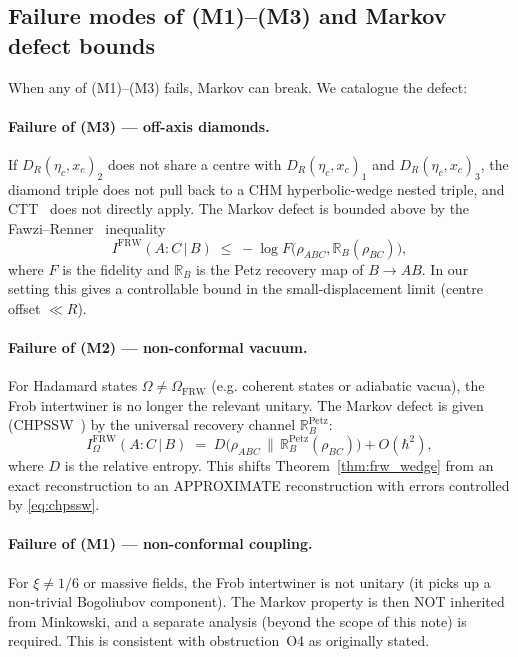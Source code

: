 \documentclass[11pt,a4paper]{article}
\theoremstyle{remark}
\newcommand{\FRW}{{\mathrm{FRW}}}
\newcommand{\R}{\mathbb{R}}
\newcommand{\DR}{D_R(\eta_c,x_c)}
\begin{document}
\subsection{Failure modes of (M1)--(M3) and Markov defect bounds}
\label{sec:markov_defect}

When any of (M1)--(M3) fails, Markov can break.  We catalogue the
defect:

\paragraph{Failure of (M3) --- off-axis diamonds.}
If $\DR_2$ does not share a centre with $\DR_1$ and $\DR_3$, the
diamond triple does not pull back to a CHM hyperbolic-wedge nested
triple, and CTT~\cite{CTT2017} does not directly apply.  The Markov
defect is bounded above by the Fawzi--Renner~\cite{FawziRenner2015}
inequality
\begin{equation}
  I^{\FRW}(A:C\,|\,B) \;\leq\; -\log F\bigl(\rho_{ABC},
   \R_B(\rho_{BC})\bigr),
\label{eq:fawzi_renner}
\end{equation}
where $F$ is the fidelity and $\R_B$ is the Petz recovery map of
$B \to AB$.  In our setting this gives a controllable bound in the
small-displacement limit (centre offset $\ll R$).

\paragraph{Failure of (M2) --- non-conformal vacuum.}
For Hadamard states $\Omega \neq \Omega_{\FRW}$ (e.g. coherent states or
adiabatic vacua), the Frob intertwiner is no longer the relevant
unitary.  The Markov defect is given (CHPSSW~\cite{CHPSSW2017}) by
the universal recovery channel $\R^{\mathrm{Petz}}_B$:
\begin{equation}
  I^{\FRW}_{\Omega}(A:C\,|\,B) \;=\;
  D\bigl(\rho_{ABC} \,\big\|\, \R^{\mathrm{Petz}}_B(\rho_{BC})\bigr) + O(\hbar^2),
\label{eq:chpssw}
\end{equation}
where $D$ is the relative entropy.  This shifts Theorem~\ref{thm:frw_wedge}
from an exact reconstruction to an APPROXIMATE reconstruction with
errors controlled by \eqref{eq:chpssw}.

\paragraph{Failure of (M1) --- non-conformal coupling.}
For $\xi \neq 1/6$ or massive fields, the Frob intertwiner is not
unitary (it picks up a non-trivial Bogoliubov component).  The Markov
property is then NOT inherited from Minkowski, and a separate analysis
(beyond the scope of this note) is required.  This is consistent with
obstruction~O4 as originally stated.
\end{document}
